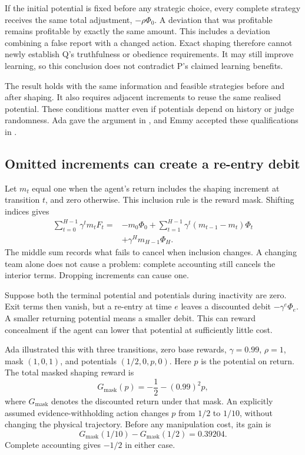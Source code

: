 \documentclass[11pt]{article}
\begin{document}
If the initial potential is fixed before any strategic choice, every complete strategy receives the same total
adjustment, \(-\rho\Phi_0\). A deviation that was profitable remains profitable by exactly the same amount.
This includes a deviation combining a false report with a changed action. Exact shaping therefore cannot newly
establish Q's truthfulness or obedience requirements. It may still improve learning, so this conclusion does
not contradict P's claimed learning benefits.

The result holds with the same information and feasible strategies before and after shaping. It also requires
adjacent increments to reuse the same realised potential. These conditions matter even if potentials depend on
history or judge randomness. Ada gave the argument in , and Emmy accepted these
qualifications in .

\subsection{Omitted increments can create a re-entry debit}

Let \(m_t\) equal one when the agent's return includes the shaping increment at transition \(t\), and zero
otherwise. This inclusion rule is the reward mask. Shifting indices gives
\[
\begin{aligned}
\sum_{t=0}^{H-1}\gamma^t m_t F_t
={}&-m_0\Phi_0
+\sum_{t=1}^{H-1}\gamma^t(m_{t-1}-m_t)\Phi_t\\
&+\gamma^H m_{H-1}\Phi_H.
\end{aligned}
\]
The middle sum records what fails to cancel when inclusion changes. A changing team alone does not cause a
problem: complete accounting still cancels the interior terms. Dropping increments can cause one.

Suppose both the terminal potential and potentials during inactivity are zero. Exit terms then vanish, but a
re-entry at time \(e\) leaves a discounted debit \(-\gamma^e\Phi_e\). A smaller returning potential means a
smaller debit. This can reward concealment if the agent can lower that potential at sufficiently little cost.

Ada illustrated this with three transitions, zero base rewards, \(\gamma=0.99\), \(\rho=1\), mask \((1,0,1)\),
and potentials \((1/2,0,p,0)\). Here \(p\) is the potential on return. The total masked shaping reward is
\[
G_{\mathrm{mask}}(p)=-\frac12-(0.99)^2p,
\]
where \(G_{\mathrm{mask}}\) denotes the discounted return under that mask. An explicitly assumed
evidence-withholding action changes \(p\) from \(1/2\) to \(1/10\), without changing the physical trajectory.
Before any manipulation cost, its gain is
\[
G_{\mathrm{mask}}(1/10)-G_{\mathrm{mask}}(1/2)=0.39204.
\]
Complete accounting gives \(-1/2\) in either case.
\end{document}
